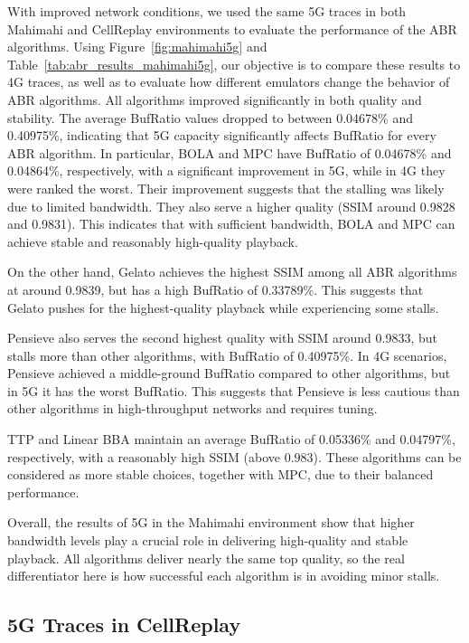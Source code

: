 With improved network conditions, we used the same 5G traces in both Mahimahi and CellReplay environments to evaluate the performance of the ABR algorithms. Using Figure~\ref{fig:mahimahi5g} and Table~\ref{tab:abr_results_mahimahi5g}, our objective is to compare these results to 4G traces, as well as to evaluate how different emulators change the behavior of ABR algorithms. All algorithms improved significantly in both quality and stability. The average BufRatio values dropped to between 0.04678\% and 0.40975\%, indicating that 5G capacity significantly affects BufRatio for every ABR algorithm. In particular, BOLA and MPC have BufRatio of 0.04678\% and 0.04864\%, respectively, with a significant improvement in 5G, while in 4G they were ranked the worst. Their improvement suggests that the stalling was likely due to limited bandwidth. They also serve a higher quality (SSIM around 0.9828 and 0.9831). This indicates that with sufficient bandwidth, BOLA and MPC can achieve stable and reasonably high-quality playback.

On the other hand, Gelato achieves the highest SSIM among all ABR algorithms at around 0.9839, but has a high BufRatio of 0.33789\%. This suggests that Gelato pushes for the highest-quality playback while experiencing some stalls. 

Pensieve also serves the second highest quality with SSIM around 0.9833, but stalls more than other algorithms, with BufRatio of 0.40975\%. In 4G scenarios, Pensieve achieved a middle-ground BufRatio compared to other algorithms, but in 5G it has the worst BufRatio. This suggests that Pensieve is less cautious than other algorithms in high-throughput networks and requires tuning.

TTP and Linear BBA maintain an average BufRatio of 0.05336\% and 0.04797\%, respectively, with a reasonably high SSIM (above 0.983). These algorithms can be considered as more stable choices, together with MPC, due to their balanced performance.

Overall, the results of 5G in the Mahimahi environment show that higher bandwidth levels play a crucial role in delivering high-quality and stable playback. All algorithms deliver nearly the same top quality, so the real differentiator here is how successful each algorithm is in avoiding minor stalls.

\subsection{5G Traces in CellReplay}

